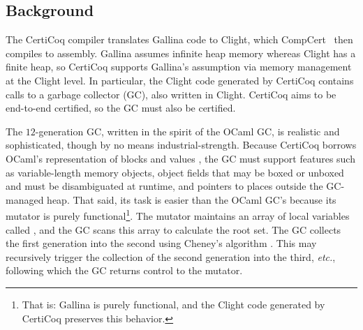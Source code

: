 

\subsection{Background}
\label{sec:gcbackground}

The CertiCoq compiler \cite{certicoqpaper} translates Gallina code to
Clight, which CompCert~\cite{leroy:compcert} then compiles to assembly.
Gallina assumes infinite heap memory whereas Clight has a 
finite heap, so
CertiCoq supports Gallina's assumption via 
memory management at the Clight level.
In particular, the Clight code generated by CertiCoq contains 
calls to a garbage collector (GC), also written in Clight. 
CertiCoq aims to be end-to-end certified, so the GC must also be certified.

The $12$-generation GC, written in the spirit of the OCaml GC,
is realistic and sophisticated, though by no means
industrial-strength.
Because CertiCoq borrows OCaml's representation of blocks and
values \cite{realworldocaml}, the GC must support features such as
variable-length memory objects, object fields that may be boxed
or unboxed and must be disambiguated at runtime, and pointers to places
outside the GC-managed heap.
That said, its task is easier than the OCaml GC's because
its mutator is purely functional\footnote{That is: Gallina is purely functional, and
the Clight code generated by CertiCoq preserves this behavior.}.
The mutator maintains an array of
local variables called , and the GC scans this array to
calculate the root set. The GC collects the first generation
into the second using Cheney's algorithm \cite{cheney:gc}.
This may recursively trigger the collection of the second generation
into the third, \emph{etc.}, following which the GC returns control to the mutator. 

